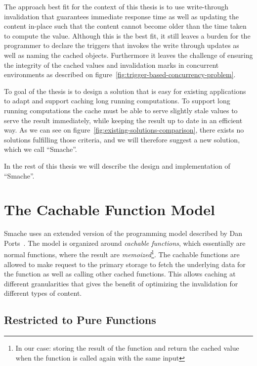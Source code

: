 The approach best fit for the context of this thesis is to use write-through invalidation that guarantees immediate response time as well as updating the content in-place such that the content cannot become older than the time taken to compute the value. Although this is the best fit, it still leaves a burden for the programmer to declare the triggers that invokes the write through updates as well as naming the cached objects. Furthermore it leaves the challenge of ensuring the integrity of the cached values and invalidation marks in concurrent environments as described on figure~\ref{fig:trigger-based-concurrency-problem}.

To goal of the thesis is to design a solution that is easy for existing applications to adapt and support caching long running computations. To support long running computations the cache must be able to serve slightly stale values to serve the result immediately, while keeping the result up to date in an efficient way. As we can see on figure~\ref{fig:existing-solutions-comparison}, there exists no solutions fulfilling those criteria, and we will therefore suggest a new solution, which we call ``Smache''.

In the rest of this thesis we will describe the design and implementation of ``Smache''.


\section{The Cachable Function Model}
\label{sec:the_cachable_function_model}

Smache uses an extended version of the programming model described by Dan Ports~\cite{paper:liskov}. The model is organized around \emph{cachable functions}, which essentially are normal functions, where the result are \emph{memoized}\footnote{In our case: storing the result of the function and return the cached value when the function is called again with the same input}. The cachable functions are allowed to make request to the primary storage to fetch the underlying data for the function as well as calling other cached functions. This allows caching at different granularities that gives the benefit of optimizing the invalidation for different types of content.


\subsection{Restricted to Pure Functions}
\label{subsec:restricted_to_pure_functions}

